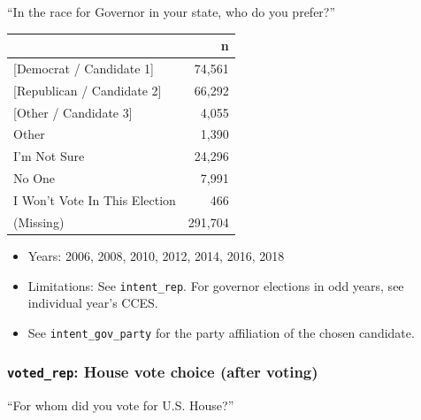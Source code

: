 \documentclass[10pt,article,oneside]{memoir}
\theoremstyle{definition}
\begin{document}
``In the race for Governor in your state, who do you prefer?''

\begin{table}[H]
\centering
\begin{tabular}{lr}
\toprule
 & n\\
\midrule
{[Democrat / Candidate 1]} & 74,561\\
{[Republican / Candidate 2]} & 66,292\\
{[Other / Candidate 3]} & 4,055\\
Other & 1,390\\
I'm Not Sure & 24,296\\
No One & 7,991\\
I Won't Vote In This Election & 466\\
(Missing) & 291,704\\
\bottomrule
\end{tabular}
\end{table}

\begin{itemize}
\tightlist
\item
  Years: 2006, 2008, 2010, 2012, 2014, 2016, 2018
\item
  Limitations: See \texttt{intent\_rep}. For governor elections in odd
  years, see individual year's CCES.
\item
  See \texttt{intent\_gov\_party} for the party affiliation of the
  chosen candidate.
\end{itemize}

\hypertarget{voted_rep-house-vote-choice-after-voting}{%
\subsubsection{\texorpdfstring{\texttt{voted\_rep}: House vote choice
(after
voting)}{voted\_rep: House vote choice (after voting)}}\label{voted_rep-house-vote-choice-after-voting}}

``For whom did you vote for U.S. House?''
\end{document}

